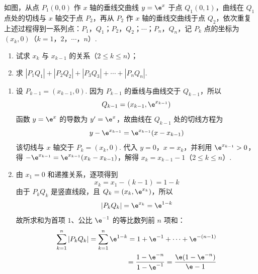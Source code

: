 \begin{problem}
如图，从点 \(P_{1}(0,0)\) 作 \(x\) 轴的垂线交曲线 \(y = \e^{x}\) 于点 \(Q_{1}(0,1)\)，曲线在 \(Q_{1}\) 点处的切线与 \(x\) 轴交于点 \(P_{2}\)，再从 \(P_{2}\) 作 \(x\) 轴的垂线交曲线于点 \(Q_{2}\)，依次重复上述过程得到一系列点：\(P_{1}\)，\(Q_{1}\)；\(P_{2}\)，\(Q_{2}\)；\(\cdots\)；\(P_{n}\)，\(Q_{n}\)，记 \(P_{k}\) 点的坐标为 \((x_{k}, 0)\)（\(k = 1\)，\(2\)，\(\cdots\)，\(n\)）.

\begin{enumerate}
\item 试求 \(x_{k}\) 与 \(x_{k-1}\) 的关系（\(2 \leqslant k \leqslant n\)）；
\item 求 \( \left|P_{1}Q_{1}\right|+\left|P_{2}Q_{2}\right|+\left|P_{3}Q_{3}\right|+\cdots+\left|P_{n}Q_{n}\right| \).
\end{enumerate}

\end{problem}

\begin{solution}
\begin{enumerate}
\item 设 \(P_{k-1}=(x_{k-1},0)\). 因为 \(P_{k-1}\) 的垂线与曲线交于 \(Q_{k-1}\)，所以
\[
Q_{k-1}=(x_{k-1},\e^{x_{k-1}})
\]
函数 \(y=\e^x\) 的导数为 \(y'=\e^x\)，故曲线在 \(Q_{k-1}\) 处的切线方程为
\[
y-\e^{x_{k-1}}=\e^{x_{k-1}}(x-x_{k-1})
\]
该切线与 \(x\) 轴交于 \(P_k=(x_k,0)\). 代入 \(y=0\)，\(x=x_k\)，并利用 \(\e^{x_{k-1}}>0\)，得
\(-\e^{x_{k-1}}=\e^{x_{k-1}}(x_k-x_{k-1})\)，解得 \(x_k=x_{k-1}-1\)（\(2\leqslant k\leqslant n\)）.
\item 由 \(x_1=0\) 和递推关系，逐项得到
\[
x_k=x_1-(k-1)=1-k
\]
由于 \(P_kQ_k\) 是竖直线段，且 \(Q_k=(x_k,\e^{x_k})\)，所以
\[
|P_kQ_k|=\e^{x_k}=\e^{1-k}
\]
故所求和为首项 \(1\)、公比 \(\e^{-1}\) 的等比数列前 \(n\) 项和：
\[
\begin{aligned}
\sum_{k=1}^{n}|P_kQ_k|=\sum_{k=1}^{n}\e^{1-k}=1+\e^{-1}+\cdots+\e^{-(n-1)}\\
=\frac{1-\e^{-n}}{1-\e^{-1}}=\frac{\e(1-\e^{-n})}{\e-1}
\end{aligned}
\]
\end{enumerate}
\end{solution}

